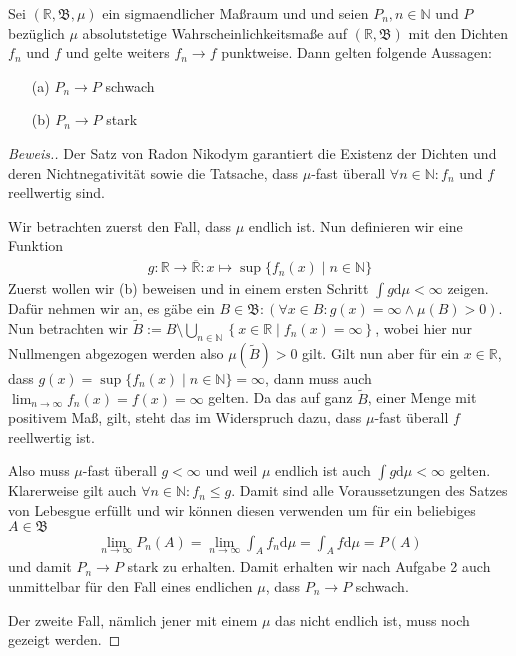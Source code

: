 \begin{lemma}
    Sei $(\mathbb{R},\mathfrak{B},\mu)$ ein sigmaendlicher Maßraum und und seien $P_n,n\in\mathbb{N}$ und $P$ bezüglich $\mu$ absolutstetige Wahrscheinlichkeitsmaße auf $(\mathbb{R},\mathfrak{B})$ mit den Dichten $f_n$ und $f$ und gelte weiters $f_n\to f$ punktweise. Dann gelten folgende Aussagen:
    \begin{itemize}
        \item[(a)] $P_n\to P$ schwach
        \item[(b)] $P_n\to P$ stark 
    \end{itemize}
\end{lemma}
\begin{proof}[Beweis.]
    Der Satz von Radon Nikodym \cite[Satz 11.19]{zbMATH06257850} garantiert die Existenz der Dichten und deren Nichtnegativität sowie die Tatsache, dass $\mu$-fast überall $\forall n\in\mathbb{N}:f_n$ und $f$ reellwertig sind.
    
    Wir betrachten zuerst den Fall, dass $\mu$ endlich ist. Nun definieren wir eine Funktion
    \begin{align*}
        g:\mathbb{R}\to\overline{\mathbb{R}}:x\mapsto\sup\{f_n(x)\mid n\in\mathbb{N}\}
    \end{align*}
    Zuerst wollen wir (b) beweisen und in einem ersten Schritt $\int g\mathrm{d}\mu<\infty$ zeigen. Dafür nehmen wir an, es gäbe ein $B\in\mathfrak{B}:\left(\forall x\in B:g(x)=\infty\land\mu(B)>0\right)$. Nun betrachten wir $\tilde{B}:=B\setminus\bigcup_{n\in\mathbb{N}}\left\{x\in\mathbb{R}\mid f_n(x)=\infty\right\}$, wobei hier nur Nullmengen abgezogen werden also $\mu\left(\tilde{B}\right)>0$ gilt. Gilt nun aber für ein $x\in\mathbb{R}$, dass $g(x)=\sup\{f_n(x)\mid n\in\mathbb{N}\}=\infty$, dann muss auch $\lim_{n\to\infty}f_n(x)=f(x)=\infty$ gelten. Da das auf ganz $\tilde{B}$, einer Menge mit positivem Maß, gilt, steht das im Widerspruch dazu, dass $\mu$-fast überall $f$ reellwertig ist. 
    
    Also muss $\mu$-fast überall $g<\infty$ und weil $\mu$ endlich ist auch $\int g\mathrm{d}\mu<\infty$ gelten. Klarerweise gilt auch $\forall n\in\mathbb{N}:f_n\leq g$. Damit sind alle Voraussetzungen des Satzes von Lebesgue \cite[Satz 9.33]{zbMATH06257850} erfüllt und wir können diesen verwenden um für ein beliebiges $A\in\mathfrak{B}$
    \begin{align*}
        \lim_{n\to\infty}P_n(A)=\lim_{n\to\infty}\int_Af_n\mathrm{d}\mu=\int_A f\mathrm{d}\mu=P(A)
    \end{align*}
    und damit $P_n\to P$ stark zu erhalten. Damit erhalten wir nach Aufgabe 2 auch unmittelbar für den Fall eines endlichen $\mu$, dass $P_n\to P$ schwach.

    Der zweite Fall, nämlich jener mit einem $\mu$ das nicht endlich ist, muss noch gezeigt werden.
\end{proof}